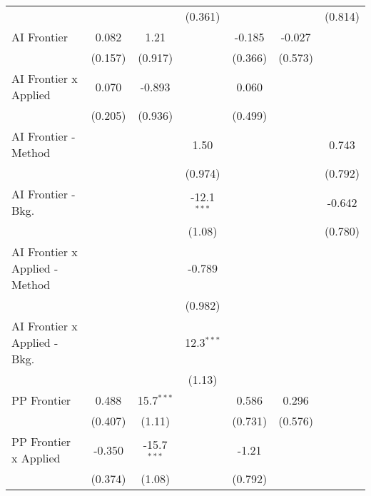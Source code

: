 \begin{tabular}{lcccccc}
                                  &               &               & (0.361)       &              &         & (0.814)\\   
   AI Frontier                    & 0.082         & 1.21          &               & -0.185       & -0.027  &   \\   
                                  & (0.157)       & (0.917)       &               & (0.366)      & (0.573) &   \\   
   AI Frontier x Applied          & 0.070         & -0.893        &               & 0.060        &         &   \\   
                                  & (0.205)       & (0.936)       &               & (0.499)      &         &   \\   
   AI Frontier - Method           &               &               & 1.50          &              &         & 0.743\\   
                                  &               &               & (0.974)       &              &         & (0.792)\\   
   AI Frontier - Bkg.             &               &               & -12.1$^{***}$ &              &         & -0.642\\   
                                  &               &               & (1.08)        &              &         & (0.780)\\   
   AI Frontier x Applied - Method &               &               & -0.789        &              &         &   \\   
                                  &               &               & (0.982)       &              &         &   \\   
   AI Frontier x Applied - Bkg.   &               &               & 12.3$^{***}$  &              &         &   \\   
                                  &               &               & (1.13)        &              &         &   \\   
   PP Frontier                    & 0.488         & 15.7$^{***}$  &               & 0.586        & 0.296   &   \\   
                                  & (0.407)       & (1.11)        &               & (0.731)      & (0.576) &   \\   
   PP Frontier x Applied          & -0.350        & -15.7$^{***}$ &               & -1.21        &         &   \\   
                                  & (0.374)       & (1.08)        &               & (0.792)      &         &   \\   

\end{tabular}
